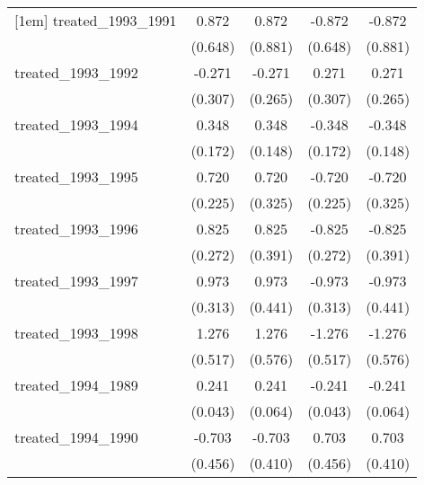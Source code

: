 {\begin{tabular}{l*{4}{c}}
[1em]
treated\_1993\_1991&       0.872         &       0.872         &      -0.872         &      -0.872         \\
            &     (0.648)         &     (0.881)         &     (0.648)         &     (0.881)         \\
[1em]
treated\_1993\_1992&      -0.271         &      -0.271         &       0.271         &       0.271         \\
            &     (0.307)         &     (0.265)         &     (0.307)         &     (0.265)         \\
[1em]
treated\_1993\_1994&       0.348\sym{*}  &       0.348\sym{*}  &      -0.348\sym{*}  &      -0.348\sym{*}  \\
            &     (0.172)         &     (0.148)         &     (0.172)         &     (0.148)         \\
[1em]
treated\_1993\_1995&       0.720\sym{**} &       0.720\sym{*}  &      -0.720\sym{**} &      -0.720\sym{*}  \\
            &     (0.225)         &     (0.325)         &     (0.225)         &     (0.325)         \\
[1em]
treated\_1993\_1996&       0.825\sym{**} &       0.825\sym{*}  &      -0.825\sym{**} &      -0.825\sym{*}  \\
            &     (0.272)         &     (0.391)         &     (0.272)         &     (0.391)         \\
[1em]
treated\_1993\_1997&       0.973\sym{**} &       0.973\sym{*}  &      -0.973\sym{**} &      -0.973\sym{*}  \\
            &     (0.313)         &     (0.441)         &     (0.313)         &     (0.441)         \\
[1em]
treated\_1993\_1998&       1.276\sym{*}  &       1.276\sym{*}  &      -1.276\sym{*}  &      -1.276\sym{*}  \\
            &     (0.517)         &     (0.576)         &     (0.517)         &     (0.576)         \\
[1em]
treated\_1994\_1989&       0.241\sym{***}&       0.241\sym{***}&      -0.241\sym{***}&      -0.241\sym{***}\\
            &     (0.043)         &     (0.064)         &     (0.043)         &     (0.064)         \\
[1em]
treated\_1994\_1990&      -0.703         &      -0.703         &       0.703         &       0.703         \\
            &     (0.456)         &     (0.410)         &     (0.456)         &     (0.410)         \\

\end{tabular}}
